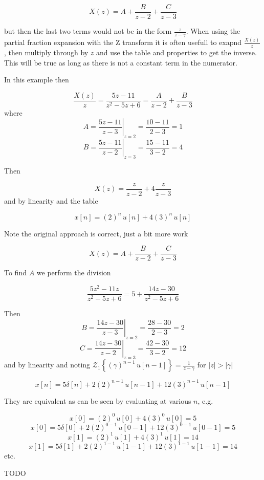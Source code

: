 \documentclass{article}
\begin{document}
$$
X(z) = A + \frac{B}{z-2} + \frac{C}{z-3}
$$

but then the last two terms would not be in the form $\frac{z}{z-\gamma}$. When using the partial fraction expansion with the Z transform it is often usefull to exapnd $\frac{X(z)}{z}$, then multiply through by $z$ and use the table and properties to get the inverse. This will be true as long as there is not a constant term in the numerator.

In this example then

$$
\frac{X(z)}{z} = \frac{5z - 11}{z^2 - 5z + 6} =  \frac{A}{z-2} + \frac{B}{z-3}
$$
where
$$
A = \left. \frac{5z-11}{z-3}\right|_{z = 2} = \frac{10-11}{2-3} = 1 
$$
$$
B = \left. \frac{5z-11}{z-2}\right|_{z = 3} = \frac{15-11}{3-2} = 4 
$$

Then

$$
X(z) = \frac{z}{z-2} + 4 \frac{z}{z-3}
$$
and by linearity and the table

$$
x[n] = (2)^n\, u[n] + 4(3)^n\, u[n]
$$

Note the original approach is correct, just a bit more work

$$
X(z) = A + \frac{B}{z-2} + \frac{C}{z-3}
$$

To find $A$ we perform the division

$$
\frac{5z^2 - 11z}{z^2 - 5z + 6} = 5 + \frac{14z-30}{z^2 - 5z + 6}
$$

Then
$$
B = \left. \frac{14z-30}{z-3}\right|_{z = 2} = \frac{28-30}{2-3} = 2 
$$
$$
C = \left. \frac{14z-30}{z-2}\right|_{z = 3} = \frac{42-30}{3-2} = 12 
$$
and by linearity and noting $\mathcal{Z}_1\left\{(\gamma)^{n-1}\, u[n-1]\right\} = \frac{1}{z-\gamma}$ for $|z| > |\gamma|$

$$
x[n] = 5\delta[n] + 2(2)^{n-1}\, u[n-1] + 12(3)^{n-1}\, u[n-1]
$$

They are equivalent as can be seen by evaluating at various $n$, e.g.

$$
x[0] = (2)^0\, u[0] + 4(3)^0\, u[0] = 5
$$
$$
x[0] = 5\delta[0] + 2(2)^{0-1}\, u[0-1] + 12(3)^{0-1}\, u[0-1] = 5
$$
$$
x[1] = (2)^1\, u[1] + 4(3)^1\, u[1] = 14
$$
$$
x[1] = 5\delta[1] + 2(2)^{1-1}\, u[1-1] + 12(3)^{1-1}\, u[1-1] = 14
$$
etc.

TODO
\end{document}
